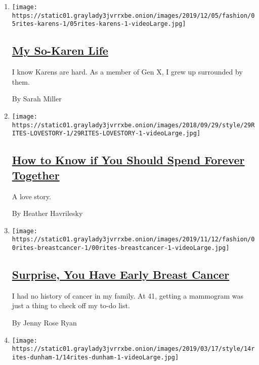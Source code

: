 \begin{enumerate}
\def\labelenumi{\arabic{enumi}.}
\item
  \texttt{[image: https://static01.graylady3jvrrxbe.onion/images/2019/12/05/fashion/05rites-karens-1/05rites-karens-1-videoLarge.jpg]}

  \hypertarget{my-so-karen-life}{%
  \subsection{\texorpdfstring{\href{/2019/12/07/style/its-karentown.html}{My
  So-Karen Life}}{My So-Karen Life}}\label{my-so-karen-life}}

  I know Karens are hard. As a member of Gen X, I grew up surrounded by
  them.

  By Sarah Miller
\item
  \texttt{[image: https://static01.graylady3jvrrxbe.onion/images/2018/09/29/style/29RITES-LOVESTORY-1/29RITES-LOVESTORY-1-videoLarge.jpg]}

  \hypertarget{how-to-know-if-you-should-spend-forever-together}{%
  \subsection{\texorpdfstring{\href{/2018/09/29/style/spending-forever-together.html}{How
  to Know if You Should Spend Forever
  Together}}{How to Know if You Should Spend Forever Together}}\label{how-to-know-if-you-should-spend-forever-together}}

  A love story.

  By Heather Havrilesky
\item
  \texttt{[image: https://static01.graylady3jvrrxbe.onion/images/2019/11/12/fashion/00rites-breastcancer-1/00rites-breastcancer-1-videoLarge.jpg]}

  \hypertarget{surprise-you-have-early-breast-cancer}{%
  \subsection{\texorpdfstring{\href{/2019/10/24/style/breast-cancer-ductal-carcinoma-in-situ.html}{Surprise,
  You Have Early Breast
  Cancer}}{Surprise, You Have Early Breast Cancer}}\label{surprise-you-have-early-breast-cancer}}

  I had no history of cancer in my family. At 41, getting a mammogram
  was just a thing to check off my to-do list.

  By Jenny Rose Ryan
\item
  \texttt{[image: https://static01.graylady3jvrrxbe.onion/images/2019/03/17/style/14rites-dunham-1/14rites-dunham-1-videoLarge.jpg]}


\end{enumerate}
